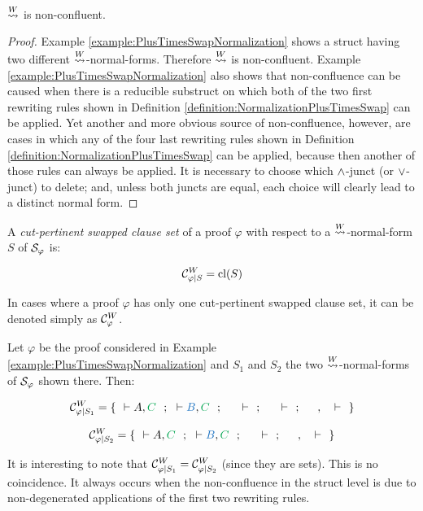 \documentclass{llncs}
\begin{document}
\begin{theorem}
$\stackrel{W}{\leadsto}$ is non-confluent.
\end{theorem}
\begin{proof}
Example \ref{example:PlusTimesSwapNormalization} shows a struct having two different $\stackrel{W}{\leadsto}$-normal-forms. Therefore $\stackrel{W}{\leadsto}$ is non-confluent. 
Example \ref{example:PlusTimesSwapNormalization} also shows that non-confluence can be caused when there is a reducible substruct on which both of the two first rewriting rules shown in Definition \ref{definition:NormalizationPlusTimesSwap} can be applied. Yet another and more obvious source of non-confluence, however, are cases in which any of the four last rewriting rules shown in Definition \ref{definition:NormalizationPlusTimesSwap} can be applied, because then another of those rules can always be applied. It is necessary to choose which $\wedge$-junct (or $\vee$-junct) to delete; and, unless both juncts are equal, each choice will clearly lead to a distinct normal form.
\end{proof}


\begin{definition}
\label{definition:CutPertinentClauseSetSwap}
A \emph{cut-pertinent swapped clause set} of a proof $\varphi$ with respect to a $\stackrel{W}{\leadsto}$-normal-form $S$ of $\mathcal{S}_{\varphi}$ is:

$$
\mathcal{C}^W_{\varphi|S}= \textrm{cl}(S)
$$

In cases where a proof $\varphi$ has only one cut-pertinent swapped clause set, it can be denoted simply as $\mathcal{C}^{W}_{\varphi}$.
\end{definition}


\begin{example}
\label{example:CutPertinentSwappedClauseSet}


Let $\varphi$ be the proof considered in Example \ref{example:PlusTimesSwapNormalization} and $S_1$ and $S_2$ the two $\stackrel{W}{\leadsto}$-normal-forms of $\mathcal{S}_{\varphi}$ shown there. Then:

$$
\clausesetSwap{\varphi}{S_1} = \{\ \ \seq \hA{A}, \hE{C} \ \ ; \ \ \seq \hB{B}, \hE{C} \ \ ;
								\ \ \hF{C} \seq \ \ ; \ \ \hF{C} \seq \ \ ; \ \ \hC{B}, \hD{A} \seq \ \ \}
$$

$$
\clausesetSwap{\varphi}{S_2} = \{\ \ \seq \hA{A}, \hE{C} \ \ ; \ \ \seq \hB{B}, \hE{C} \ \ ;
							 \ \ \hF{C} \seq \ \ ; \ \ \hC{B}, \hD{A} \seq \ \ \}
$$

It is interesting to note that $\mathcal{C}^W_{\varphi|S_1} = \mathcal{C}^W_{\varphi|S_2}$ (since they are sets). This is no coincidence. It always occurs when the non-confluence in the struct level is due to non-degenerated applications of the first two rewriting rules. 
\end{example}
\end{document}
